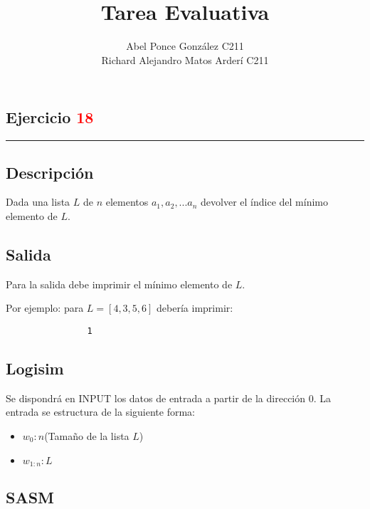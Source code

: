\documentclass[a4paper]{article}
\title{\textbf {Tarea Evaluativa} }
\author{Abel Ponce González C211\\
	Richard Alejandro Matos Arderí C211	
}
\begin{document}
	\maketitle

	\begin{flushleft}

      		\section*{Ejercicio \textcolor{red}{18}}
      	     \rule{\linewidth}{2pt}	
      		
      		\subsection*{Descripción}
      		
      		Dada una lista $L$ de $n$ elementos $a_{1}, a_{2}, ... a_{n}$ devolver el índice del mínimo elemento de $L$.
      		
      		\subsection*{Salida}
      		
      		Para la salida debe imprimir el mínimo elemento de $L$.
      		
      		Por ejemplo: para $L = [4, 3, 5, 6]$ debería imprimir: 
      		
      		\begin{lstlisting}
      			1
      		\end{lstlisting}      		
      		
      		\subsection*{Logisim}
      		
      		Se dispondrá en INPUT los datos de entrada a partir de la dirección 0. La entrada se estructura de la siguiente forma:
      		
      		\begin{itemize}
      			
      			\item $w_{0}: n $(Tamaño de la lista $L$)
      			\item $w_{1:n} : L$
      		\end{itemize}
      		
      		\subsection*{SASM}
      		

\end{flushleft}
\end{document}

